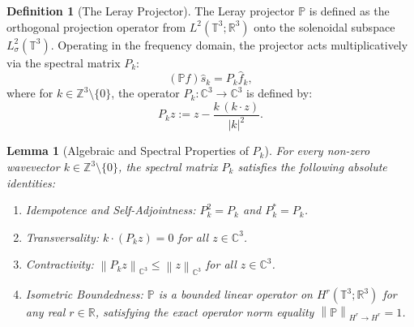 \documentclass[12pt,a4paper]{article}
\theoremstyle{plain}
\newtheorem{lemma}[theorem]{Lemma}
\theoremstyle{definition}
\newtheorem{definition}[theorem]{Definition}
\theoremstyle{remark}
\newcommand{\T}{\mathbb{T}}
\newcommand{\Z}{\mathbb{Z}}
\newcommand{\R}{\mathbb{R}}
\newcommand{\norm}[1]{\left\|#1\right\|}
\newcommand{\PP}{\mathbb{P}}
\newcommand{\sphat}{\hat{s}}
\begin{document}
\begin{definition}[The Leray Projector]
\label{def:leray}
The Leray projector $\PP$ is defined as the orthogonal projection operator from $L^2(\T^3; \R^3)$ onto the solenoidal subspace $L^2_\sigma(\T^3)$. Operating in the frequency domain, the projector acts multiplicatively via the spectral matrix $P_k$:
\[
  (\PP f)\sphat_k = P_k \hat{f}_k,
\]
where for $k \in \Z^3 \setminus \{0\}$, the operator $P_k : \mathbb{C}^3 \to \mathbb{C}^3$ is defined by:
\[
  P_k z := z - \frac{k\,(k\cdot z)}{|k|^2}.
\]
\end{definition}

\begin{lemma}[Algebraic and Spectral Properties of $P_k$]
\label{lem:Pk}
For every non-zero wavevector $k \in \Z^3 \setminus \{0\}$, the spectral matrix $P_k$ satisfies the following absolute identities:
\begin{enumerate}[label=(\roman*)]
  \item Idempotence and Self-Adjointness: $P_k^2 = P_k$ and $P_k^* = P_k$.
  \item Transversality: $k \cdot (P_k z) = 0$ for all $z\in\mathbb{C}^3$.
  \item Contractivity: $\norm{P_k z}_{\mathbb{C}^3} \le \norm{z}_{\mathbb{C}^3}$ for all $z\in\mathbb{C}^3$.
  \item Isometric Boundedness: $\PP$ is a bounded linear operator on $H^r(\T^3;\R^3)$ for any real $r\in\R$, satisfying the exact operator norm equality $\norm{\PP}_{H^r\to H^r} = 1$.
\end{enumerate}
\end{lemma}
\end{document}
